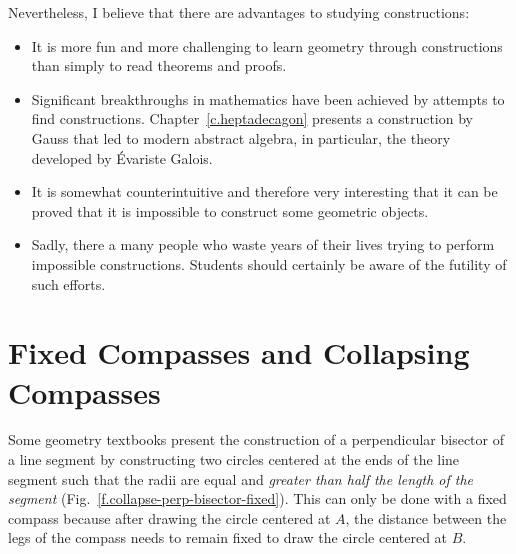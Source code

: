 Nevertheless, I believe that there are advantages to studying constructions:
\begin{itemize}
\item It is more fun and more challenging to learn geometry through constructions than simply to read theorems and proofs.
\item Significant breakthroughs in mathematics have been achieved by attempts to find constructions. Chapter~\ref{c.heptadecagon} presents a construction by Gauss that led to modern abstract algebra, in particular, the theory developed by \'{E}variste Galois.
\item It is somewhat counterintuitive and therefore very interesting that it can be proved that it is impossible to construct some geometric objects.
\item Sadly, there a many people who waste years of their lives trying to perform impossible constructions. Students should certainly be aware of the futility of such efforts.
\end{itemize}

\section{Fixed Compasses and Collapsing Compasses}\label{s.collapse}

Some geometry textbooks present the construction of a perpendicular bisector of a line segment by constructing two circles centered at the ends of the line segment such that the radii are equal and \emph{greater than half the length of the segment} (Fig.~\ref{f.collapse-perp-bisector-fixed}). This can only be done with a fixed compass because after drawing the circle centered at $A$, the distance between the legs of the compass needs to remain fixed to draw the circle centered at $B$.

